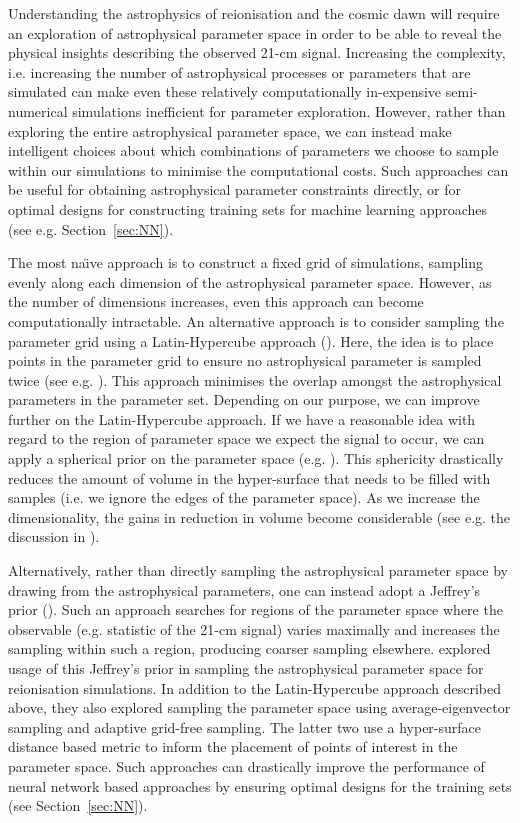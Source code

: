 Understanding the astrophysics of reionisation and the cosmic dawn will require an exploration of astrophysical parameter space in order to be able to reveal the physical insights describing the observed 21-cm signal. Increasing the complexity, i.e. increasing the number of astrophysical processes or parameters that are simulated can make even these relatively computationally in-expensive semi-numerical simulations inefficient for parameter exploration. However, rather than exploring the entire astrophysical parameter space, we can instead make intelligent choices about which combinations of parameters we choose to sample within our simulations to minimise the computational costs. Such approaches can be useful for obtaining astrophysical parameter constraints directly, or for optimal designs for constructing training sets for machine learning approaches (see e.g. Section~\ref{sec:NN}). 

The most na\"{\i}ve approach is to construct a fixed grid of simulations, sampling evenly along each dimension of the astrophysical parameter space. However, as the number of dimensions increases, even this approach can become computationally intractable. An alternative approach is to consider sampling the parameter grid using a Latin-Hypercube approach (\cite{McKay:1979}). Here, the idea is to place points in the parameter grid to ensure no astrophysical parameter is sampled twice (see e.g. \cite{Kern:2017,Schmit:2018}). This approach minimises the overlap amongst the astrophysical parameters in the parameter set. Depending on our purpose, we can improve further on the Latin-Hypercube approach. If we have a reasonable idea with regard to the region of parameter space we expect the signal to occur, we can apply a spherical prior on the parameter space (e.g. \cite{Schneider:2011}). This sphericity drastically reduces the amount of volume in the hyper-surface that needs to be filled with samples (i.e. we ignore the edges of the parameter space). As we increase the dimensionality, the gains in reduction in volume become considerable (see e.g. the discussion in \cite{Kern:2017}).

Alternatively, rather than directly sampling the astrophysical parameter space by drawing from the astrophysical parameters, one can instead adopt a Jeffrey's prior (\cite{Jeffreys:1946}). Such an approach searches for regions of the parameter space where the observable (e.g. statistic of the 21-cm signal) varies maximally and increases the sampling within such a region, producing coarser sampling elsewhere. \cite{Eames:2018} explored usage of this Jeffrey's prior in sampling the astrophysical parameter space for reionisation simulations. In addition to the Latin-Hypercube approach described above, they also explored sampling the parameter space using average-eigenvector sampling and adaptive grid-free sampling. The latter two use a hyper-surface distance based metric to inform the placement of points of interest in the parameter space. Such approaches can drastically improve the performance of neural network based approaches by ensuring optimal designs for the training sets (see Section~\ref{sec:NN}).

